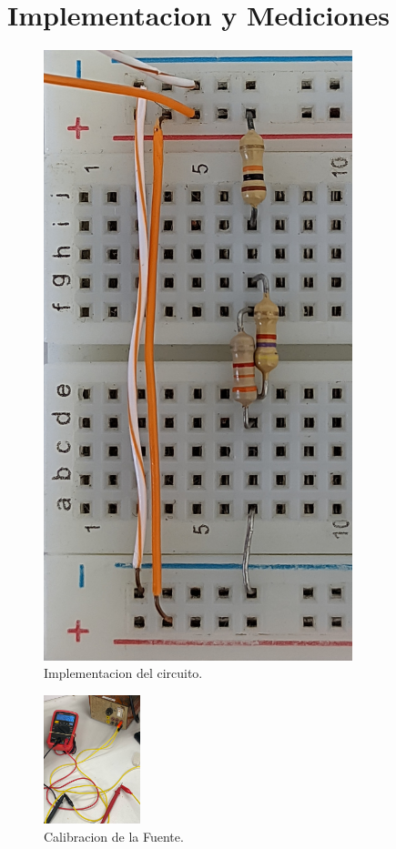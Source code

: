 \documentclass[a4paper,12pt, spanish]{report}
\begin{document}
      \section{Implementacion y Mediciones}
      \begin{figure}[!h]
        \centering
        \includegraphics[angle=270, width=0.8\textwidth]{pictures/prot-crkt.jpg}
        \caption{Implementacion del circuito.}
        \label{prot-crkt}
      \end{figure}
      \begin{figure}
        \vspace{-0.3cm}
        \centering
        \includegraphics[width=0.25\textwidth]{pictures/mult-vs.jpeg}
        \caption{Calibracion de la Fuente.}
        \label{mult-vs}
      \end{figure}
\end{document}
